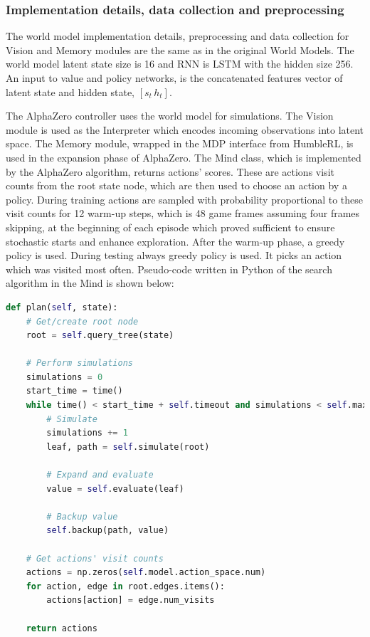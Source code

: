 \subsubsection{Implementation details, data collection and preprocessing}

The world model implementation details, preprocessing and data collection for Vision and Memory modules are the same as in the original World Models. The world model latent state size is 16 and RNN is LSTM \cite{Algo.LSTM} with the hidden size 256. An input to value and policy networks, is the concatenated features vector of latent state and hidden state, $[s_t\,h_t]$.

The AlphaZero controller uses the world model for simulations. The Vision module is used as the Interpreter which encodes incoming observations into latent space. The Memory module, wrapped in the MDP interface from HumbleRL, is used in the expansion phase of AlphaZero. The Mind class, which is implemented by the AlphaZero algorithm, returns actions' scores. These are actions visit counts from the root state node, which are then used to choose an action by a policy. During training actions are sampled with probability proportional to these visit counts for 12 warm-up steps, which is 48 game frames assuming four frames skipping, at the beginning of each episode which proved sufficient to ensure stochastic starts and enhance exploration. After the warm-up phase, a greedy policy is used. During testing always greedy policy is used. It picks an action which was visited most often. Pseudo-code written in Python of the search algorithm in the Mind is shown below:

\noindent\begin{minipage}{\textwidth} %
\begin{lstlisting}[language=Python]
def plan(self, state):
    # Get/create root node
    root = self.query_tree(state)

    # Perform simulations
    simulations = 0
    start_time = time()
    while time() < start_time + self.timeout and simulations < self.max_simulations:
        # Simulate
        simulations += 1
        leaf, path = self.simulate(root)

        # Expand and evaluate
        value = self.evaluate(leaf)

        # Backup value
        self.backup(path, value)

    # Get actions' visit counts
    actions = np.zeros(self.model.action_space.num)
    for action, edge in root.edges.items():
        actions[action] = edge.num_visits

    return actions
\end{lstlisting}
\end{minipage}

